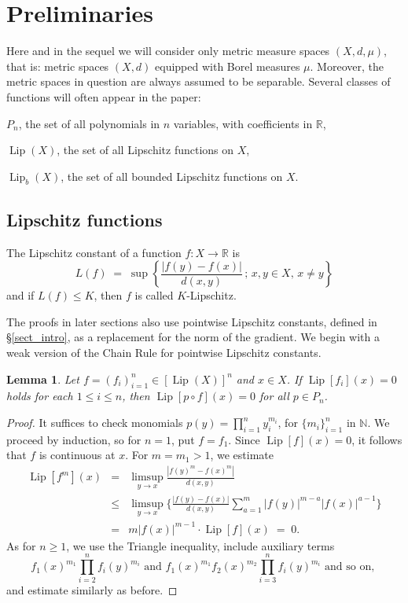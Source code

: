 \documentclass[reqno]{amsart}
\theoremstyle{plain}
\newtheorem{lemma}[thm]{Lemma}
\theoremstyle{definition}
\theoremstyle{remark}
\numberwithin{equation}{section}
\newcommand{\Lip}{\operatorname{Lip}}
\newcommand{\N}{\mathbb{N}}
\newcommand{\R}{\mathbb{R}}
\begin{document}
\section{Preliminaries} \label{sect_prelim}

Here and in the sequel we will consider only metric measure spaces $(X,d,\mu)$, that is: metric spaces $(X,d)$ equipped with Borel measures $\mu$.  Moreover, the metric spaces in question are always assumed to be separable.  Several classes of functions will often appear in the paper:

$P_n$, the set of all polynomials in $n$ variables, with coefficients in $\R$,

$\Lip(X)$, the set of all Lipschitz functions on $X$,

$\Lip_b(X)$, the set of all bounded Lipschitz functions on $X$.


\subsection{Lipschitz functions}

The Lipschitz constant of a function $f: X \to \R$ is
$$
L(f) \;=\; \sup\left\{ \frac{|f(y)-f(x)|}{d(x,y)} \,;\, x,y \in X,\, x \neq y\right\}
$$
and if $L(f) \leq K$, then $f$ is called $K$-Lipschitz.

The proofs in later sections also use pointwise Lipschitz constants, defined in \S\ref{sect_intro}, as a replacement for the norm of the gradient.  We begin with a weak version of the Chain Rule for pointwise Lipschitz constants.

\begin{lemma} \label{lemma_polylipzero}
Let $f = (f_i)_{i=1}^n \in [\Lip(X)]^n$ and $x \in X$.  If $\Lip[f_i](x) = 0$ holds for each $1 \leq i \leq n$, then $\Lip[p \circ f](x) = 0$ for all $p \in P_n$.
\end{lemma}

\begin{proof}
It suffices to check monomials %
$
p(y) = \prod_{i=1}^n y_i^{m_i} %
$,
for $\{m_i\}_{i=1}^n$ in $\N$.  We proceed by induction, so for $n=1$, put $f = f_1$.  Since $\Lip[f](x) = 0$, it follows that $f$ is continuous at $x$.  %
For $m = m_1 > 1$, we estimate %
\begin{eqnarray*}
\Lip[f^m](x) &=&
\limsup_{y \to x} \frac{|f(y)^m-f(x)^m|}{d(x,y)} \\ &\leq&
\limsup_{y \to x} \Big\{ 
\frac{|f(y)-f(x)|}{d(x,y)} \sum_{a=1}^m |f(y)|^{m-a}|f(x)|^{a-1} \Big\} \\ &=&
m|f(x)|^{m-1} \cdot \Lip[f](x) \;=\; 0.
\end{eqnarray*}
As for $n \geq 1$, we use the Triangle inequality, include auxiliary terms
$$
f_1(x)^{m_1} \prod_{i=2}^n f_i(y)^{m_i} \text{ and }
f_1(x)^{m_1}f_2(x)^{m_2} \prod_{i=3}^n f_i(y)^{m_i} \text{ and so on, }
$$
and estimate similarly as before.
\end{proof}
\end{document}
